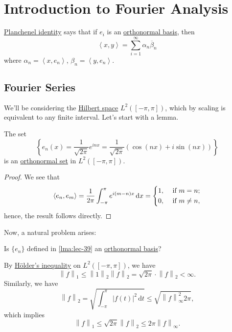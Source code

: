 \chapter{Introduction to Fourier Analysis}\label{ch:Introduction-to-Fourier-Analysis}
\begin{prev}
	\hyperref[note:Planchenel-identity]{Planchenel identity}  says that if \(e_{i} \) is an \hyperref[def:orthonormal-basis]{orthonormal basis},
	then
	\[
		\left< x, y \right> = \sum_{i=1}^{\infty} \alpha _{n} \overline{\beta} _n
	\]
	where \(\alpha _n = \left< x, e_{n}  \right> \), \(\beta _n = \left< y, e_{n}  \right> \).
\end{prev}

\section{Fourier Series}
We'll be considering the \hyperref[def:Hilbert-space]{Hilbert space} \(L^2([-\pi , \pi ])\), which by scaling is equivalent to
any finite interval. Let's start with a lemma.
\begin{lemma}\label{lma:lec-39}
	The set
	\[
		\left\{e_{n} (x) = \frac{1}{\sqrt{2\pi } }e^{inx} = \frac{1}{\sqrt{2\pi }}\left(\cos (nx) + i\sin (nx)\right)\right\}
	\]
	is an \hyperref[def:orthonormal-set]{orthonormal set} in \(L^2([-\pi , \pi ])\).
\end{lemma}
\begin{proof}
	We see that
	\[
		\left< e_{n} , e_{m}  \right> = \frac{1}{2\pi } \int_{-\pi}^{\pi } e^{i(m-n)x} \,\mathrm{d}x = \begin{dcases}
			1, & \text{ if } m = n ;    \\
			0, & \text{ if } m \neq n ,
		\end{dcases}
	\]
	hence, the result follows directly.
\end{proof}

Now, a natural problem arises:
\begin{problem}
Is \(\{e_{n} \}\) defined in \autoref{lma:lec-39} an \hyperref[def:orthonormal-basis]{orthonormal basis}?
\end{problem}
\begin{answer}
	By \hyperref[thm:Holder-inequality]{Hölder's inequality} on \(L^{2} ([-\pi , \pi ])\), we have
	\[
		\left\lVert f\right\rVert _1 \leq \left\lVert 1\right\rVert _2 \left\lVert f\right\rVert _2 = \sqrt{2\pi } \cdot \left\lVert f\right\rVert _2 < \infty .
	\]
	Similarly, we have
	\[
		\left\lVert f\right\rVert _2 = \sqrt{\int_{-\pi}^{\pi} \left\vert f(t) \right\vert ^{2} \,\mathrm{d}t} \leq \sqrt{\left\lVert f\right\rVert ^{2} _\infty 2\pi },
	\]
	which implies
	\[
		\left\lVert f\right\rVert _1 \leq \sqrt{2\pi } \left\lVert f\right\rVert _2 \leq 2\pi \left\lVert f\right\rVert _\infty .
	\]
\end{answer}

